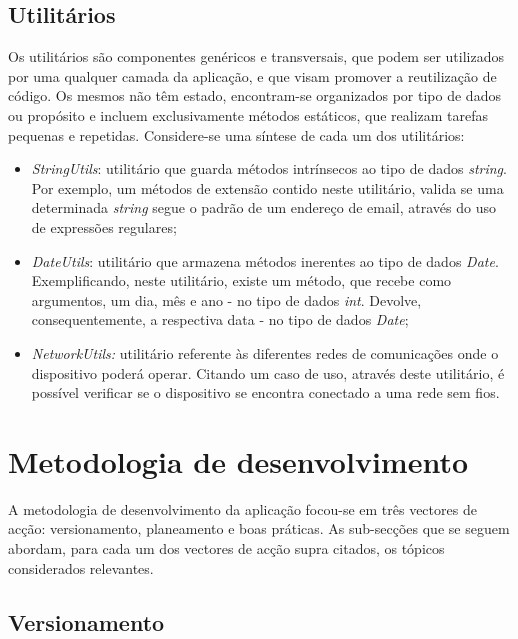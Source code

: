 \documentclass[12pt]{report}
\begin{document}
\clearpage

\subsection{Utilitários}

Os utilitários são componentes genéricos e transversais, que podem ser utilizados por uma qualquer camada da aplicação, e que visam promover a reutilização de código. Os mesmos não têm estado, encontram-se organizados por tipo de dados ou propósito e incluem exclusivamente métodos estáticos, que realizam tarefas pequenas e repetidas. Considere-se uma síntese de cada um dos utilitários:

\begin{itemize}
    \item \emph{StringUtils}: utilitário que guarda métodos intrínsecos ao tipo de dados \textit{string}. Por exemplo, um métodos de extensão contido neste utilitário, valida se uma determinada \textit{string} segue o padrão de um endereço de email, através do uso de expressões regulares; 
    
    \item \emph{DateUtils}: utilitário que armazena métodos inerentes ao tipo de dados \textit{Date}. Exemplificando, neste utilitário, existe um método, que recebe como argumentos, um dia, mês e ano - no tipo de dados \textit{int}. Devolve, consequentemente, a respectiva data - no tipo de dados \textit{Date};
    
    \item \emph{NetworkUtils:} utilitário referente às diferentes redes de comunicações onde o dispositivo poderá operar. Citando um caso de uso, através deste utilitário, é possível verificar se o dispositivo se encontra conectado a uma rede sem fios.
\end{itemize}

\clearpage

\section{Metodologia de desenvolvimento}

A metodologia de desenvolvimento da aplicação focou-se em três vectores de acção: versionamento, planeamento e boas práticas. As sub-secções que se seguem abordam, para cada um dos vectores de acção supra citados, os tópicos considerados relevantes.

\subsection{Versionamento}
\end{document}
